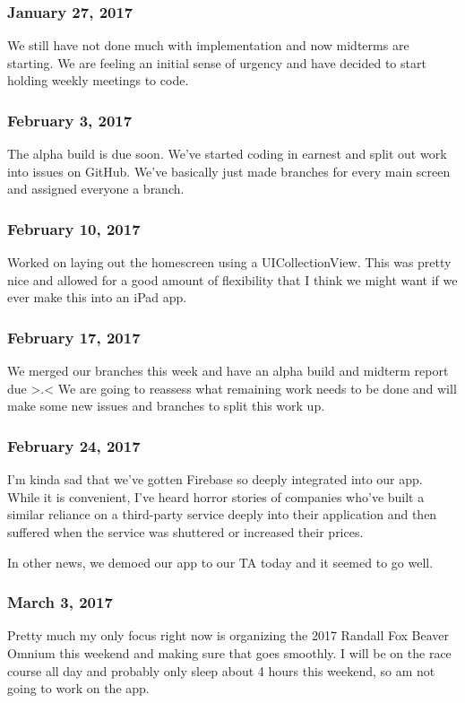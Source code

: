 \subsubsection{January 27, 2017}\label{section}
We still have not done much with implementation and now midterms are 
starting. We are feeling an initial sense of urgency and have decided 
to start holding weekly meetings to code.

\subsubsection{February 3, 2017}\label{section}
The alpha build is due soon. We've started coding in earnest and split 
out work into issues on GitHub. We've basically just made branches for 
every main screen and assigned everyone a branch.

\subsubsection{February 10, 2017}\label{section}
Worked on laying out the homescreen using a UICollectionView. This was 
pretty nice and allowed for a good amount of flexibility that I think 
we might want if we ever make this into an iPad app.

\subsubsection{February 17, 2017}\label{section}
We merged our branches this week and have an alpha build and midterm 
report due >.< We are going to reassess what remaining work needs to 
be done and will make some new issues and branches to split this work 
up.

\subsubsection{February 24, 2017}\label{section}
I'm kinda sad that we've gotten Firebase so deeply integrated into 
our app. While it is convenient, I've heard horror stories of companies 
who've built a similar reliance on a third-party service deeply into 
their application and then suffered when the service was shuttered 
or increased their prices.

In other news, we demoed our app to our TA today and it seemed to go 
well.

\subsubsection{March 3, 2017}\label{section}
Pretty much my only focus right now is organizing the 2017 Randall 
Fox Beaver Omnium this weekend and making sure that goes smoothly. 
I will be on the race course all day and probably only sleep about 
4 hours this weekend, so am not going to work on the app.

